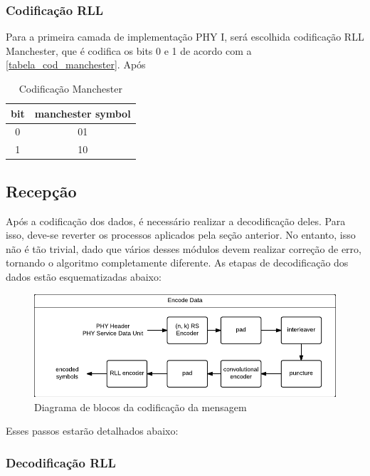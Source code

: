 	\subsubsection{Codificação RLL}
	
	Para a primeira camada de implementação PHY I, será escolhida codificação RLL Manchester, que é codifica os bits 0 e 1 de acordo com a \autoref{tabela_cod_manchester}. Após 
	
	\begin{table}[ht]
		\caption{Codificação Manchester}
		\centering
		\begin{tabular}{c c}
			\hline
			bit & manchester symbol \\ \hline
			0 & 01 \\
			1 & 10 \\ \hline
		\end{tabular}
		\label{tabela_cod_manchester}
	\end{table}
	
	\subsection{Recepção}
	
	Após a codificação dos dados, é necessário realizar a decodificação deles. Para isso, deve-se reverter os processos aplicados pela seção anterior. No entanto, isso não é tão trivial, dado que vários desses módulos devem realizar correção de erro, tornando o algoritmo completamente diferente. As etapas de decodificação dos dados estão esquematizadas abaixo:

	\begin{figure}[htb]
		\caption{\label{fig_transmission_phy1} Diagrama de blocos da codificação da mensagem}
		\centering
		\includegraphics[width=0.6\textheight]{PHY1-transmission.pdf}
	\end{figure}

	Esses passos estarão detalhados abaixo:
	
	
	\subsubsection{Decodificação RLL}
